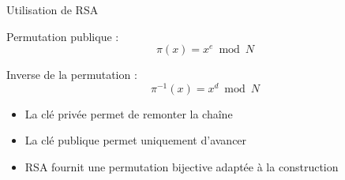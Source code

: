 \documentclass{beamer}
\begin{document}
\begin{frame}{Utilisation de RSA}

Permutation publique :
\[
\pi(x) = x^e \bmod N
\]

Inverse de la permutation :
\[
\pi^{-1}(x) = x^d \bmod N
\]

\vspace{0.4cm}

\begin{itemize}
    \item La clé privée permet de remonter la chaîne
    \item La clé publique permet uniquement d'avancer
    \item RSA fournit une permutation bijective adaptée à la construction
\end{itemize}

\end{frame}

\end{document}
